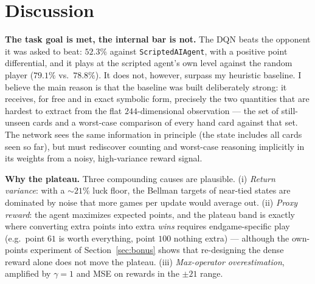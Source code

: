 \documentclass{article}
\begin{document}
\section{Discussion}
\label{sec:discussion}

\textbf{The task goal is met, the internal bar is not.} The DQN beats the opponent it was asked to beat: $52.3\%$ against \texttt{ScriptedAIAgent}, with a positive point differential, and it plays at the scripted agent's own level against the random player ($79.1\%$ vs.\ $78.8\%$). It does not, however, surpass my heuristic baseline. I believe the main reason is that the baseline was built deliberately strong: it receives, for free and in exact symbolic form, precisely the two quantities that are hardest to extract from the flat $244$-dimensional observation --- the set of still-unseen cards and a worst-case comparison of every hand card against that set. The network sees the same information in principle (the state includes all cards seen so far), but must rediscover counting and worst-case reasoning implicitly in its weights from a noisy, high-variance reward signal.

\textbf{Why the plateau.} Three compounding causes are plausible. (i) \emph{Return variance}: with a $\sim 21\%$ luck floor, the Bellman targets of near-tied states are dominated by noise that more games per update would average out. (ii) \emph{Proxy reward}: the agent maximizes expected points, and the plateau band is exactly where converting extra points into extra \emph{wins} requires endgame-specific play (e.g.\ point $61$ is worth everything, point $100$ nothing extra) --- although the own-points experiment of Section~\ref{sec:bonus} shows that re-designing the dense reward alone does not move the plateau. (iii) \emph{Max-operator overestimation}, amplified by $\gamma=1$ and MSE on rewards in the $\pm 21$ range.

\nocite{sutton2018reinforcement}



\end{document}
